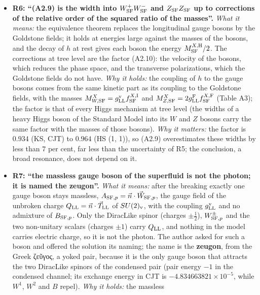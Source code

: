 \documentclass[
  10pt,
]{article}
\begin{document}
\begin{itemize}
  the mass, a width larger than the mass in every method.
\item
  \textbf{R6: ``(A2.9) is the width into \(W^+_{\rm SF}W^-_{\rm SF}\)
  and \(Z_{\rm SF}Z_{\rm SF}\) up to corrections of the relative order
  of the squared ratio of the masses''.} \emph{What it means:} the
  equivalence theorem replaces the longitudinal gauge bosons by the
  Goldstone fields; it holds at energies large against the masses of the
  bosons, and the decay of \(h\) at rest gives each boson the energy
  \(M^{X,{\rm H}}_{\rm SF}/2\). The corrections at tree level are the
  factor (A2.10): the velocity of the bosons, which reduces the phase
  space, and the transverse polarizations, which the Goldstone fields do
  not have. \emph{Why it holds:} the coupling of \(h\) to the gauge
  bosons comes from the same kinetic part as its coupling to the
  Goldstone fields, with the masses
  \(M^X_{W,{\rm SF}}=g^{\rm v}_{\rm LL}f^{X,{\rm I}}_{\rm SF}\) and
  \(M^X_{Z,{\rm SF}}=2g^{\rm F}_{\rm LL}f^{X,{\rm F}}_{\rm SF}\) (Table
  A3); the factor is that of every Higgs mechanism at tree level (the
  widths of a heavy Higgs boson of the Standard Model into its \(W\) and
  \(Z\) bosons carry the same factor with the masses of those bosons).
  \emph{Why it matters:} the factor is \(0.934\) (KS, CJT) to \(0.964\)
  (HS (1, 1)), so (A2.9) overestimates these widths by less than \(7\)
  per cent, far less than the uncertainty of R5; the conclusion, a broad
  resonance, does not depend on it.
\item
  \textbf{R7: ``the massless gauge boson of the superfluid is not the
  photon; it is named the zeugon''.} \emph{What it means:} after the
  breaking exactly one gauge boson stays massless,
  \(A_{{\rm SF},p}=\vec n\cdot\vec W_{{\rm SF},p}\), the gauge field of
  the unbroken charge \(Q_{\rm LL}=\vec n\cdot\vec T_{\rm LL}\) of
  \(SU(2)_{\rm v}\), with the coupling \(g^{\rm v}_{\rm LL}\) and no
  admixture of \(B_{{\rm SF},p}\). Only the DiracLike spinor (charges
  \(\pm\tfrac12\)), \(W^\pm_{{\rm SF},p}\) and the two non-unitary
  scalars (charges \(\pm1\)) carry \(Q_{\rm LL}\), and nothing in the
  model carries electric charge, so it is not the photon. The author
  asked for such a boson and offered the solution its naming; the name
  is the \textbf{zeugon}, from the Greek ζεῦγος, a yoked pair, because
  it is the only gauge boson that attracts the two DiracLike spinors of
  the condensed pair (pair energy \(-1\) in the condensed channel; its
  exchange energy in CJT is \(-4.834663821\times10^{-5}\), while
  \(W^1\), \(W^2\) and \(B\) repel). \emph{Why it holds:} the massless

\end{itemize}
\end{document}
